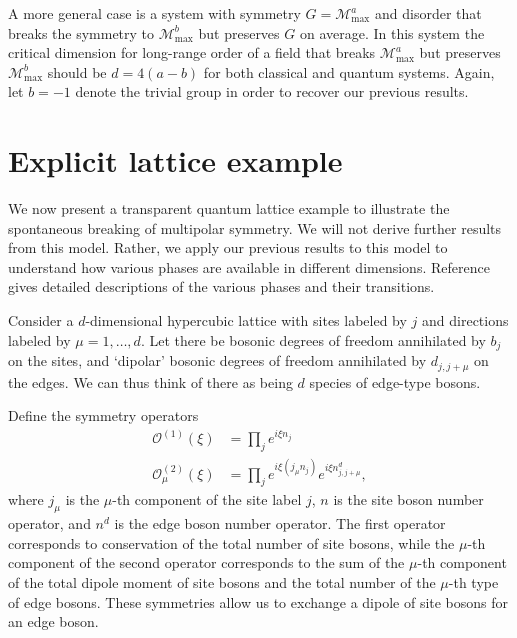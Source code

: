 \documentclass[prb,aps,twocolumn, amsfonts,amsmath,amssymb,nofootinbib,superscriptaddress]{revtex4-2}
\newcommand{\op}[1]{\mathcal{O}^{(#1)}}
\newcommand{\nn}{\nonumber\\}
\renewcommand{\max}{\text{max}}
\newcommand{\mmax}[1]{\mathcal{M}^{#1}_\max}
\begin{document}
A more general case is a system with symmetry $G = \mathcal{M}_\max^a$ and disorder that breaks the symmetry to $\mathcal{M}_\max^b$ but preserves $G$ on average. In this system the critical dimension for long-range order of a field that breaks $\mmax{a}$ but preserves $\mmax{b}$ should be $d=4(a-b)$ for both classical and quantum systems. Again, let $b=-1$ denote the trivial group in order to recover our previous results.

\section{Explicit lattice example} \label{sec:example}

We now present a transparent quantum lattice example to illustrate the spontaneous breaking of multipolar symmetry. We will not derive further results from this model. Rather, we apply our previous results to this model to understand how various phases are available in different dimensions. Reference~\cite{dbhm} gives detailed descriptions of the various phases and their transitions.

Consider a $d$-dimensional hypercubic lattice with sites labeled by $j$ and directions labeled by $\mu = 1,\dots,d$. Let there be bosonic degrees of freedom annihilated by $b_j$ on the sites, and `dipolar' bosonic degrees of freedom annihilated by $d_{j,j+\mu}$ on the edges. We can thus think of there as being $d$ species of edge-type bosons.

Define the symmetry operators
\begin{align}
\op{1}(\xi) &= \prod_je^{i\xi n_j}\nn
\op{2}_\mu(\xi) &= \prod_j e^{i\xi (j_\mu n_j)}e^{i\xi n^d_{j,j+\mu}},
\end{align}
where $j_\mu$ is the $\mu$-th component of the site label $j$, $n$ is the site boson number operator, and $n^d$ is the edge boson number operator.
The first operator corresponds to conservation of the total number of site bosons, while the $\mu$-th component of the second operator corresponds to the sum of the $\mu$-th component of the total dipole moment of site bosons and the total number of the $\mu$-th type of edge bosons. These symmetries allow us to exchange a dipole of site bosons for an edge boson. 
\end{document}
